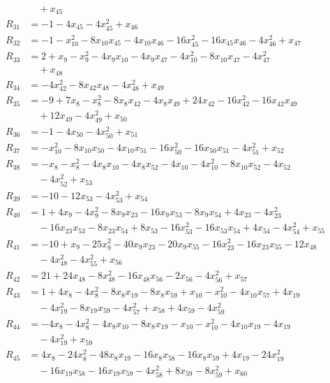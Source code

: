 \begin{align*}
&\quad +x_{45}\\[2pt]
R_{31}&=-1-4x_{45}-4x_{45}^{2}+x_{46}\\[2pt]
R_{32}&=-1-x_{10}^{2}-8x_{10}x_{45}-4x_{10}x_{46}-16x_{45}^{2}-16x_{45}x_{46}-4x_{46}^{2}+x_{47}\\[2pt]
R_{33}&=2+x_{9}-x_{9}^{2}-4x_{9}x_{10}-4x_{9}x_{47}-4x_{10}^{2}-8x_{10}x_{47}-4x_{47}^{2}\\
&\quad +x_{48}\\[2pt]
R_{34}&=-4x_{42}^{2}-8x_{42}x_{48}-4x_{48}^{2}+x_{49}\\[2pt]
R_{35}&=-9+7x_{8}-x_{8}^{2}-8x_{8}x_{42}-4x_{8}x_{49}+24x_{42}-16x_{42}^{2}-16x_{42}x_{49}\\
&\quad +12x_{49}-4x_{49}^{2}+x_{50}\\[2pt]
R_{36}&=-1-4x_{50}-4x_{50}^{2}+x_{51}\\[2pt]
R_{37}&=-x_{10}^{2}-8x_{10}x_{50}-4x_{10}x_{51}-16x_{50}^{2}-16x_{50}x_{51}-4x_{51}^{2}+x_{52}\\[2pt]
R_{38}&=-x_{8}-x_{8}^{2}-4x_{8}x_{10}-4x_{8}x_{52}-4x_{10}-4x_{10}^{2}-8x_{10}x_{52}-4x_{52}\\
&\quad -4x_{52}^{2}+x_{53}\\[2pt]
R_{39}&=-10-12x_{53}-4x_{53}^{2}+x_{54}\\[2pt]
R_{40}&=1+4x_{9}-4x_{9}^{2}-8x_{9}x_{23}-16x_{9}x_{53}-8x_{9}x_{54}+4x_{23}-4x_{23}^{2}\\
&\quad -16x_{23}x_{53}-8x_{23}x_{54}+8x_{53}-16x_{53}^{2}-16x_{53}x_{54}+4x_{54}-4x_{54}^{2}+x_{55}\\[2pt]
R_{41}&=-10+x_{9}-25x_{9}^{2}-40x_{9}x_{23}-20x_{9}x_{55}-16x_{23}^{2}-16x_{23}x_{55}-12x_{48}\\
&\quad -4x_{48}^{2}-4x_{55}^{2}+x_{56}\\[2pt]
R_{42}&=21+24x_{48}-8x_{48}^{2}-16x_{48}x_{56}-2x_{56}-4x_{56}^{2}+x_{57}\\[2pt]
R_{43}&=1+4x_{8}-4x_{8}^{2}-8x_{8}x_{19}-8x_{8}x_{59}+x_{10}-x_{10}^{2}-4x_{10}x_{57}+4x_{19}\\
&\quad -4x_{19}^{2}-8x_{19}x_{59}-4x_{57}^{2}+x_{58}+4x_{59}-4x_{59}^{2}\\[2pt]
R_{44}&=-4x_{8}-4x_{8}^{2}-4x_{8}x_{10}-8x_{8}x_{19}-x_{10}-x_{10}^{2}-4x_{10}x_{19}-4x_{19}\\
&\quad -4x_{19}^{2}+x_{59}\\[2pt]
R_{45}&=4x_{8}-24x_{8}^{2}-48x_{8}x_{19}-16x_{8}x_{58}-16x_{8}x_{59}+4x_{19}-24x_{19}^{2}\\
&\quad -16x_{19}x_{58}-16x_{19}x_{59}-4x_{58}^{2}+8x_{59}-8x_{59}^{2}+x_{60}\\[2pt]

\end{align*}
